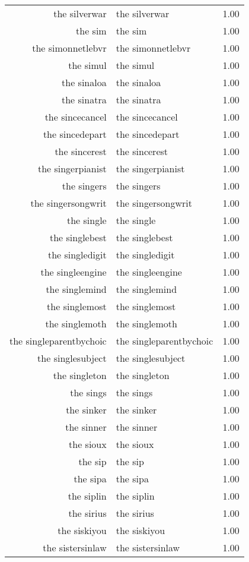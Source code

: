\begin{table}[ht]
\begin{tabular}{rlr}
  the silverwar & the silverwar & 1.00 \\ 
  the sim & the sim & 1.00 \\ 
  the simonnetlebvr & the simonnetlebvr & 1.00 \\ 
  the simul & the simul & 1.00 \\ 
  the sinaloa & the sinaloa & 1.00 \\ 
  the sinatra & the sinatra & 1.00 \\ 
  the sincecancel & the sincecancel & 1.00 \\ 
  the sincedepart & the sincedepart & 1.00 \\ 
  the sincerest & the sincerest & 1.00 \\ 
  the singerpianist & the singerpianist & 1.00 \\ 
  the singers & the singers & 1.00 \\ 
  the singersongwrit & the singersongwrit & 1.00 \\ 
  the single & the single & 1.00 \\ 
  the singlebest & the singlebest & 1.00 \\ 
  the singledigit & the singledigit & 1.00 \\ 
  the singleengine & the singleengine & 1.00 \\ 
  the singlemind & the singlemind & 1.00 \\ 
  the singlemost & the singlemost & 1.00 \\ 
  the singlemoth & the singlemoth & 1.00 \\ 
  the singleparentbychoic & the singleparentbychoic & 1.00 \\ 
  the singlesubject & the singlesubject & 1.00 \\ 
  the singleton & the singleton & 1.00 \\ 
  the sings & the sings & 1.00 \\ 
  the sinker & the sinker & 1.00 \\ 
  the sinner & the sinner & 1.00 \\ 
  the sioux & the sioux & 1.00 \\ 
  the sip & the sip & 1.00 \\ 
  the sipa & the sipa & 1.00 \\ 
  the siplin & the siplin & 1.00 \\ 
  the sirius & the sirius & 1.00 \\ 
  the siskiyou & the siskiyou & 1.00 \\ 
  the sistersinlaw & the sistersinlaw & 1.00 \\ 

\end{tabular}
\end{table}
